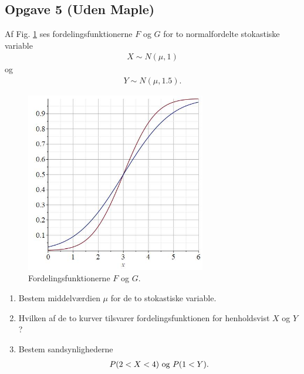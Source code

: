 \subsection*{Opgave 5 (Uden Maple)}
	Af Fig. \ref{fig:fordeling} ses fordelingsfunktionerne $F$ og $G$ for to normalfordelte stokastiske variable
	\begin{align*}
		X \sim N(\mu,1)
	\end{align*}
	og 
	\begin{align*}
		Y \sim N(\mu,1.5).
	\end{align*}
	\begin{figure}[H]
		\centering
		\includegraphics[width=0.7\textwidth]{Billeder/fordelingafl.jpg}
		\caption{Fordelingsfunktionerne $F$ og $G$.}
		\label{fig:fordeling}
	\end{figure}
\begin{enumerate}[label=\roman*)]
	\item Bestem middelværdien $\mu$ for de to stokastiske variable.
	\item Hvilken af de to kurver tilsvarer fordelingsfunktionen for henholdsvist $X$ og $Y$?
	\item Bestem sandsynlighederne
		\begin{align*}
			P(2<X<4) \textnormal{ og } P(1<Y).
		\end{align*}
\end{enumerate}
